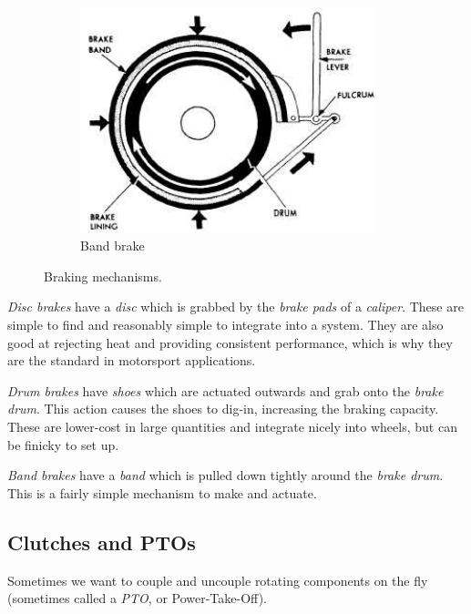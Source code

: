 \begin{figure}[H]
\begin{subfigure}[b]{.32\linewidth}
		\includegraphics[width=0.95\textwidth]{imgs/brake_band.jpeg}
		\caption{Band brake}
	\end{subfigure}
	\caption{Braking mechanisms.}
\end{figure}

\begin{asparaenum}[a)]
	\item \textit{Disc brakes} have a \textit{disc} which is grabbed by the \textit{brake pads} of a \textit{caliper}. These are simple to find and reasonably simple to integrate into a system. They are also good at rejecting heat and providing consistent performance, which is why they are the standard in motorsport applications.
	\item \textit{Drum brakes} have \textit{shoes} which are actuated outwards and grab onto the \textit{brake drum}. This action causes the shoes to dig-in, increasing the braking capacity. These are lower-cost in large quantities and integrate nicely into wheels, but can be finicky to set up.
	\item \textit{Band brakes} have a \textit{band} which is pulled down tightly around the \textit{brake drum}. This is a fairly simple mechanism to make and actuate. 
\end{asparaenum}


\subsection{Clutches and PTOs}

Sometimes we want to couple and uncouple rotating components on the fly (sometimes called a \textit{PTO}, or Power-Take-Off).

